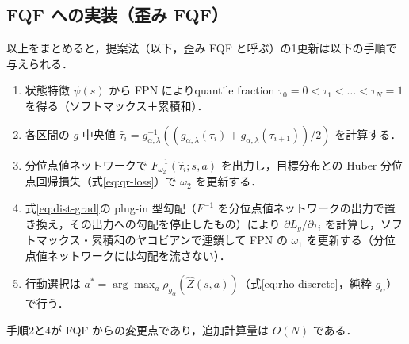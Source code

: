 \documentclass[a4paper,10pt]{jsarticle}
\theoremstyle{definition}
\newcommand{\Finv}{F^{-1}}
\begin{document}
\subsection{FQF への実装（歪み FQF）}
\label{subsec:impl}
以上をまとめると，提案法（以下，歪み FQF と呼ぶ）の1更新は以下の手順で与えられる．
\begin{enumerate}
  \item 状態特徴 $\psi(s)$ から FPN によりquantile fraction $\tau_0=0<\tau_1<\dots<\tau_N=1$ を得る（ソフトマックス＋累積和）．
  \item 各区間の $g$-中央値 $\hat\tau_i=g_{\alpha,\lambda}^{-1}\!\left((g_{\alpha,\lambda}(\tau_i)+g_{\alpha,\lambda}(\tau_{i+1}))/2\right)$ を計算する．
  \item 分位点値ネットワークで $\Finv_{\omega_2}(\hat\tau_i;s,a)$ を出力し，目標分布との Huber 分位点回帰損失（式\eqref{eq:qr-loss}）で $\omega_2$ を更新する．
  \item 式\eqref{eq:dist-grad}の plug-in 型勾配（$\Finv$ を分位点値ネットワークの出力で置き換え，その出力への勾配を停止したもの）により $\partial L_g/\partial\tau_i$ を計算し，ソフトマックス・累積和のヤコビアンで連鎖して FPN の $\omega_1$ を更新する（分位点値ネットワークには勾配を流さない）．
  \item 行動選択は $a^*=\arg\max_a\rho_{g_\alpha}(\hat Z(s,a))$（式\eqref{eq:rho-discrete}，純粋 $g_\alpha$）で行う．
\end{enumerate}
手順2と4が FQF からの変更点であり，追加計算量は $O(N)$ である．
\end{document}
